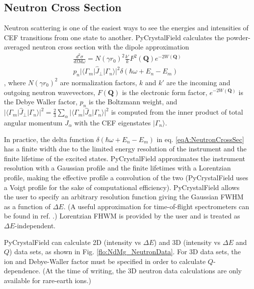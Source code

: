 \documentclass[twocolumn,english,prb]{revtex4-2}
\begin{document}
\subsection{Neutron Cross Section}

Neutron scattering is one of the easiest ways to see the energies and intensities of CEF transitions from one state to another. PyCrystalField calculates the powder-averaged neutron cross section with the dipole approximation
\begin{multline}
\frac{d^2\sigma}{d\Omega d\omega} = N (\gamma r_0)^2 \frac{k'}{k}F^2(\mathbf{Q}) e^{-2W(\mathbf{Q})} \\
p_n|\langle \Gamma_m|\hat J_{\perp}|\Gamma_n \rangle|^2 \delta(\hbar \omega + E_n - E_m)
\label{eqA:NeutronCrossSec}
\end{multline}
\cite{Furrer2009neutron}, where $N (\gamma r_0)^2$ are normalization factors, $k$ and $k'$ are the incoming and outgoing neutron wavevectors, $F(\mathbf{Q})$ is the electronic form factor, $e^{-2W(\mathbf{Q})}$ is the Debye Waller factor, $p_n$ is the Boltzmann weight, and $|\langle \Gamma_m|\hat J_{\perp}|\Gamma_n \rangle|^2  = 
\frac{2}{3} \sum_{\alpha} |\langle \Gamma_m|\hat J_{\alpha}|\Gamma_n \rangle|^2 $ is computed from the inner product of total angular momentum $J_{\alpha}$ with the CEF eigenstates $|\Gamma_n \rangle$.

In practice, the delta function $\delta(\hbar \omega + E_n - E_m)$ in eq. \ref{eqA:NeutronCrossSec} has a finite width due to the limited energy resolution of the instrument and the finite lifetime of the excited states. PyCrystalField approximates the instrument resolution with a Gaussian profile and the finite lifetimes with a Lorentzian profile, making the effective profile a convolution of the two (PyCrystalField uses a Voigt profile for the sake of computational efficiency). PyCrystalField allows the user to specify an arbitrary resolution function giving the Gaussian FWHM as a function of $\Delta E$. (A useful approximation for time-of-flight spectrometers can be found in ref. \cite{ARCS_resolution}.) Lorentzian FHWM is provided by the user and is treated as $\Delta E$-independent.


PyCrystalField can calculate 2D (intensity vs $\Delta E$) and 3D (intensity vs $\Delta E$ and $Q$) data sets, as shown in Fig. \ref{flo:NdMg_NeutronData}. For 3D data sets, the ion and Debye-Waller factor must be specified in order to calculate $Q$-dependence. (At the time of writing, the 3D neutron data calculations are only available for rare-earth ions.)
\end{document}
